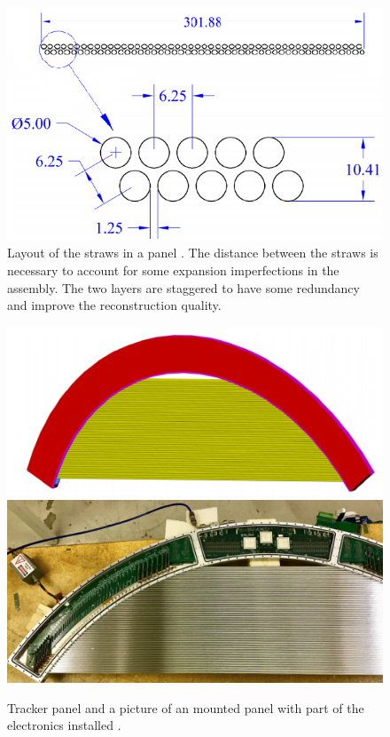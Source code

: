 \documentclass[12pt,a4paper,openright, oneside, titlepage]{book} %
\begin{document}
\begin{figure}[h!]
\centering
\includegraphics[scale=0.8]{Tracker_panel_geom}
\caption[Layout of straws in a panel]{Layout of the straws in a panel \cite{MTDR}. 
The distance between the straws is necessary to account for some expansion imperfections in the assembly. 
The two layers are staggered to have some redundancy and improve the reconstruction quality.}
\label{_Tracker_panel_geom}
\end{figure}

\begin{figure}[h!]
\centering
\includegraphics[scale=0.2]{Tracker_panel}
\includegraphics[scale=0.25]{Tracker_panel_picture}
\caption[A panel of the tracker]{Tracker panel \cite{MTDR} and a picture of an mounted panel with part of the electronics installed \cite{Manolis}.}
\label{_Tracker_panel}
\end{figure}
\end{document}
